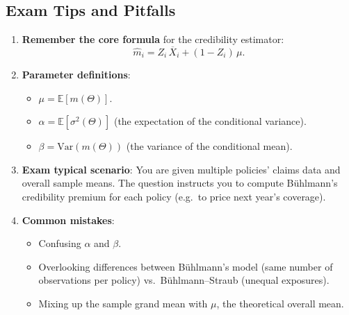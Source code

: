 \documentclass[13pt,a4paper]{article}
\begin{document}
\subsection{Exam Tips and Pitfalls}
\begin{enumerate}
  \item \textbf{Remember the core formula} for the credibility estimator:
  \[
    \hat{m}_i 
    = Z_i \,\overline{X}_i 
    + (1 - Z_i)\,\mu.
  \]
  \item \textbf{Parameter definitions}:
    \begin{itemize}
      \item \(\mu = \mathbb{E}[m(\Theta)]\).
      \item \(\alpha = \mathbb{E}[\sigma^2(\Theta)]\) (the expectation of the conditional variance).
      \item \(\beta = \mathrm{Var}(m(\Theta))\) (the variance of the conditional mean).
    \end{itemize}
  \item \textbf{Exam typical scenario}: You are given multiple policies’ claims data and overall sample means. The question instructs you to compute B\"{u}hlmann’s credibility premium for each policy (e.g.\ to price next year’s coverage).
  \item \textbf{Common mistakes}:
    \begin{itemize}
      \item Confusing \(\alpha\) and \(\beta\).
      \item Overlooking differences between B\"{u}hlmann’s model (same number of observations per policy) vs.\ B\"{u}hlmann--Straub (unequal exposures).
      \item Mixing up the sample grand mean with \(\mu\), the theoretical overall mean.
    \end{itemize}
\end{enumerate}
\end{document}
